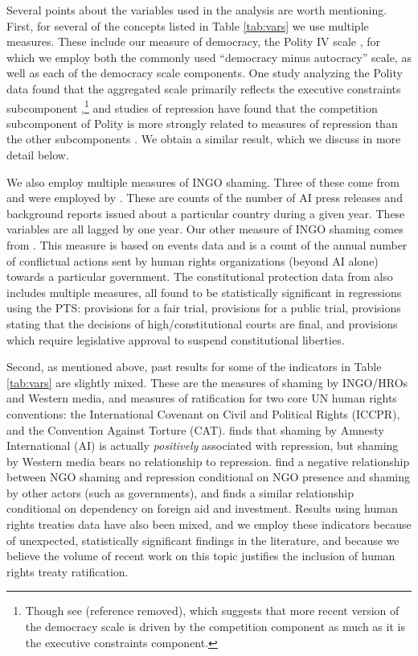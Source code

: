 \documentclass[11pt]{article}
\begin{document}
Several points about the variables used in the analysis are worth mentioning. First, for several of the concepts listed in Table \ref{tab:vars} we use multiple measures. These include our measure of democracy, the Polity IV scale \citep{MarshallJaggers2009}, for which we employ both the commonly used ``democracy minus autocracy'' scale, as well as each of the democracy scale components. One study analyzing the Polity data found that the aggregated scale primarily reflects the executive constraints subcomponent \citep{GleditschWard1997},\footnote{Though see (reference removed), which suggests that more recent version of the democracy scale is driven by the competition component as much as it is the executive constraints component.} and studies of repression have found that the competition subcomponent of Polity is more strongly related to measures of repression than the other subcomponents \citep{Keith2002PRQ, BDMetal2005}. We obtain a similar result, which we discuss in more detail below.  

We also employ multiple measures of INGO shaming. Three of these come from \citet{RonRamosRodgers2005} and were employed by \citet{HafnerBurton2008}. These are counts of the number of AI press releases and background reports issued about a particular country during a given year. These variables are all lagged by one year. Our other measure of INGO shaming comes from \citet{MurdieDavis2012}. This measure is based on events data and is a count of the annual number of conflictual actions sent by human rights organizations (beyond AI alone) towards a particular government. The constitutional protection data from \citet{KeithTatePoe2009} also includes multiple measures, all found to be statistically significant in regressions using the PTS: provisions for a fair trial, provisions for a public trial, provisions stating that the decisions of high/constitutional courts are final, and provisions which require legislative approval to suspend constitutional liberties. 

Second, as mentioned above, past results for some of the indicators in Table \ref{tab:vars} are slightly mixed. These are the measures of shaming by INGO/HROs and Western media, and measures of ratification for two core UN human rights conventions: the International Covenant on Civil and Political Rights (ICCPR), and the Convention Against Torture (CAT). \citet{HafnerBurton2008} finds that shaming by Amnesty International (AI) is actually {\it positively} associated with repression, but shaming by Western media bears no relationship to repression. \citet{MurdieDavis2012} find a negative relationship between NGO shaming and repression conditional on NGO presence and shaming by other actors (such as governments), and \citet{Franklin2008} finds a similar relationship conditional on dependency on foreign aid and investment. Results using human rights treaties data have also been mixed, and we employ these indicators because of unexpected, statistically significant findings in the literature, and because we believe the volume of recent work on this topic justifies the inclusion of human rights treaty ratification. 
\end{document}
